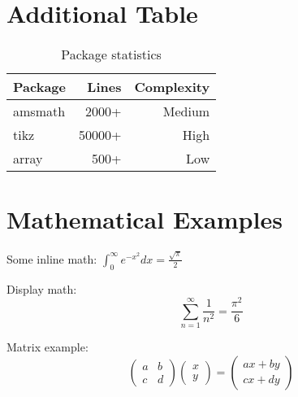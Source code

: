 \documentclass{article}
\begin{document}
\section{Additional Table}
\begin{table}[h]
\centering
\begin{tabular}{|l|r|r|}
\hline
Package & Lines & Complexity \\
\hline
amsmath & 2000+ & Medium \\
tikz & 50000+ & High \\
array & 500+ & Low \\
\hline
\end{tabular}
\caption{Package statistics}
\end{table}

\section{Mathematical Examples}
Some inline math: $\int_0^\infty e^{-x^2} dx = \frac{\sqrt{\pi}}{2}$

Display math:
\begin{equation}
\sum_{n=1}^\infty \frac{1}{n^2} = \frac{\pi^2}{6}
\end{equation}

Matrix example:
\begin{equation}
\begin{pmatrix}
a & b \\
c & d
\end{pmatrix}
\begin{pmatrix}
x \\
y
\end{pmatrix}
=
\begin{pmatrix}
ax + by \\
cx + dy
\end{pmatrix}
\end{equation}
\end{document}
